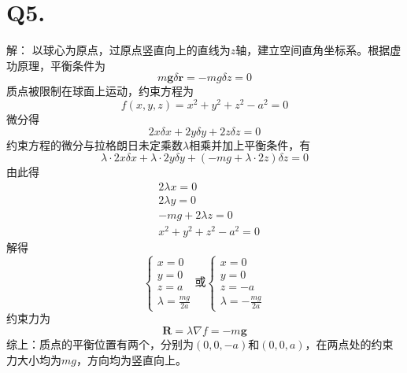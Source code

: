 \documentclass[10pt,a4paper]{article}
\begin{document}
\section*{Q5.}解：
以球心为原点，过原点竖直向上的直线为$z$轴，建立空间直角坐标系。根据虚功原理，平衡条件为
\[
m\bm{g}\delta\bm{r} = -mg\delta z = 0
\]
质点被限制在球面上运动，约束方程为
\[
f(x,y,z) = x^2 + y^2 + z^2 - a^2 = 0
\]
微分得
\[
2x\delta x + 2y\delta y + 2z\delta z = 0
\]
约束方程的微分与拉格朗日未定乘数$\lambda$相乘并加上平衡条件，有
\[
\lambda\cdot2x\delta x + \lambda\cdot2y\delta y + (-mg + \lambda\cdot2z)\delta z = 0
\]
由此得
\begin{align*}
&2\lambda x = 0\\
&2\lambda y = 0\\
&-mg + 2\lambda z = 0\\
&x^2 + y^2 + z^2 - a^2 = 0
\end{align*}
解得
\[
\left\{\begin{array}{l}
x = 0\\
y = 0\\
z = a\\
\lambda = \frac{mg}{2a}
\end{array}\right.
\text{或}
\left\{\begin{array}{l}
x = 0\\
y = 0\\
z = -a\\
\lambda = -\frac{mg}{2a}
\end{array}\right.
\]
约束力为
\[
\bm{R} = \lambda\nabla f = -m\bm{g}
\]
综上：质点的平衡位置有两个，分别为$(0,0,-a)$和$(0,0,a)$，在两点处的约束力大小均为$mg$，方向均为竖直向上。
\end{document}

